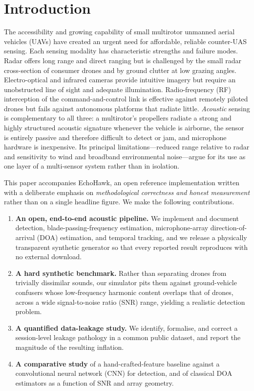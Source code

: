 \documentclass[11pt]{article}
\begin{document}
\section{Introduction}
The accessibility and growing capability of small multirotor unmanned aerial
vehicles (UAVs) have created an urgent need for affordable, reliable
counter-UAS sensing. Each sensing modality has characteristic strengths and
failure modes. Radar offers long range and direct ranging but is challenged by
the small radar cross-section of consumer drones and by ground clutter at low
grazing angles. Electro-optical and infrared cameras provide intuitive imagery
but require an unobstructed line of sight and adequate illumination.
Radio-frequency (RF) interception of the command-and-control link is effective
against remotely piloted drones but fails against autonomous platforms that
radiate little. \emph{Acoustic} sensing is complementary to all three: a
multirotor's propellers radiate a strong and highly structured acoustic
signature whenever the vehicle is airborne, the sensor is entirely passive and
therefore difficult to detect or jam, and microphone hardware is inexpensive.
Its principal limitations---reduced range relative to radar and sensitivity to
wind and broadband environmental noise---argue for its use as one layer of a
multi-sensor system rather than in isolation.

This paper accompanies EchoHawk, an open reference implementation written with a
deliberate emphasis on \emph{methodological correctness and honest measurement}
rather than on a single headline figure. We make the following contributions.

\begin{enumerate}
\item \textbf{An open, end-to-end acoustic pipeline.} We implement and document
detection, blade-passing-frequency estimation, microphone-array direction-of-arrival
(DOA) estimation, and temporal tracking, and we release a physically transparent
synthetic generator so that every reported result reproduces with no external
download.
\item \textbf{A hard synthetic benchmark.} Rather than separating drones from
trivially dissimilar sounds, our simulator pits them against ground-vehicle
confusers whose low-frequency harmonic content overlaps that of drones, across a
wide signal-to-noise ratio (SNR) range, yielding a realistic detection problem.
\item \textbf{A quantified data-leakage study.} We identify, formalise, and
correct a session-level leakage pathology in a common public dataset, and report
the magnitude of the resulting inflation.
\item \textbf{A comparative study} of a hand-crafted-feature baseline against a
convolutional neural network (CNN) for detection, and of classical DOA estimators
as a function of SNR and array geometry.
\end{enumerate}
\end{document}
